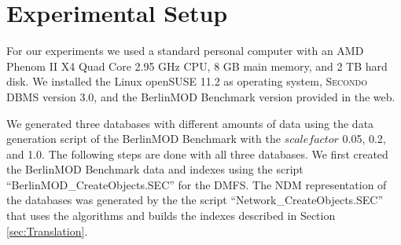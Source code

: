 \documentclass[a4paper]{article}
\newcommand{\secondo}{\textsc{Secondo}}
\newcommand{\bmodb} {BerlinMOD Benchmark}
\begin{document}
\section{Experimental Setup}
\label{sec:scenario}
For our experiments we used a standard personal computer with an AMD Phenom II X4
Quad Core 2.95 GHz CPU, 8 GB main memory, and 2 TB hard disk. We installed the
Linux openSUSE 11.2 as operating system, \secondo{} DBMS version 3.0, and
the \bmodb{} version provided in the web.

We generated three databases with different amounts of data using the data generation
script of the \bmodb{} with the $scalefactor$ 0.05, 0.2, and 1.0. The following
steps are done with all three databases. We first created the \bmodb{} data and indexes
using the script ``BerlinMOD\_CreateObjects.SEC'' for the DMFS. The NDM
representation of the databases was generated by the the script ``Network\_CreateObjects.SEC''
that uses the algorithms and builds the indexes described in Section \ref{sec:Translation}.
\end{document}
